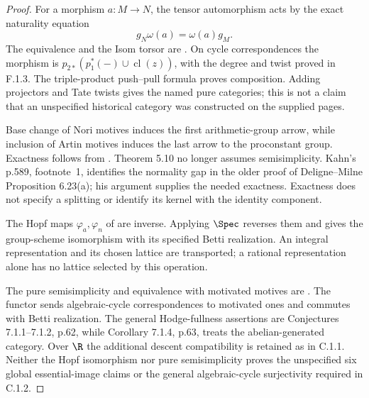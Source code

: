 \begin{proof}
For a morphism $a:M\to N$, the tensor automorphism acts by the exact naturality equation
\[
 g_N\omega(a)=\omega(a)g_M.
\]
The equivalence and the Isom torsor are \cite[Theorems 2.11 and 3.2]{DM1982}. On cycle correspondences the morphism is $p_{2*}(p_1^*(-)\cup\operatorname{cl}(z))$, with the degree and twist proved in F.1.3. The triple-product push--pull formula proves composition. Adding projectors and Tate twists gives the named pure categories; this is not a claim that an unspecified historical category was constructed on the supplied pages.

Base change of Nori motives induces the first arithmetic-group arrow, while inclusion of Artin motives induces the last arrow to the proconstant group. Exactness follows from \cite[Theorem 5.10, \S5.8, Theorem 10.2 and Remark 10.3]{AuditKahn2025}. Theorem 5.10 no longer assumes semisimplicity. Kahn's p.589, footnote~1, identifies the normality gap in the older proof of Deligne--Milne Proposition 6.23(a); his argument supplies the needed exactness. Exactness does not specify a splitting or identify its kernel with the identity component.

The Hopf maps $\varphi_a,\varphi_n$ of \cite[Theorem 9.1, p.41]{AuditChoudhuryGallauer2017} are inverse. Applying $\Spec$ reverses them and gives the group-scheme isomorphism with its specified Betti realization. An integral representation and its chosen lattice are transported; a rational representation alone has no lattice selected by this operation.

The pure semisimplicity and equivalence with motivated motives are \cite[Theorems 6.3.3 and 6.4.1, pp.57 and 60--61]{AuditArapura2013}. The functor sends algebraic-cycle correspondences to motivated ones and commutes with Betti realization. The general Hodge-fullness assertions are Conjectures 7.1.1--7.1.2, p.62, while Corollary 7.1.4, p.63, treats the abelian-generated category. Over $\R$ the additional descent compatibility is retained as in C.1.1. Neither the Hopf isomorphism nor pure semisimplicity proves the unspecified six global essential-image claims or the general algebraic-cycle surjectivity required in C.1.2.
\end{proof}

